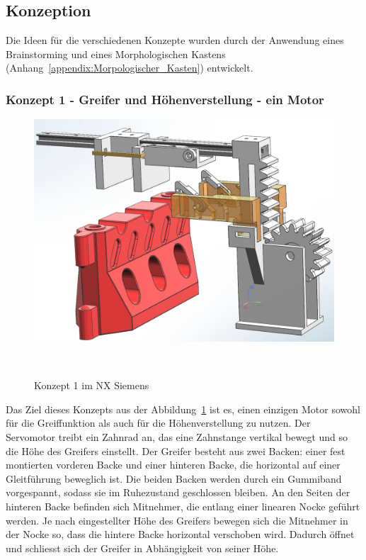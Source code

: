 \documentclass[main.tex]{subfiles} %
\begin{document}
\newpage

\subsection*{Konzeption}

Die Ideen für die verschiedenen Konzepte wurden durch der Anwendung eines Brainstorming und eines Morphologischen Kastens (Anhang~\ref{appendix:Morpologischer_Kasten}) entwickelt.

\subsubsection*{Konzept 1 - Greifer und Höhenverstellung - ein Motor}

\begin{figure}[H]
    \centering
    \includegraphics[width=1\textwidth]{Konzept_1_Ein_Motor.png}
    \caption{Konzept 1 im NX Siemens}~\label{fig:Konzept_1}
\end{figure}

Das Ziel dieses Konzepts aus der Abbildung~\ref{fig:Konzept_1} ist es, einen einzigen Motor sowohl für die Greiffunktion als auch für die Höhenverstellung zu nutzen. 
Der Servomotor treibt ein Zahnrad an, das eine Zahnstange vertikal bewegt und so die Höhe des Greifers einstellt.
Der Greifer besteht aus zwei Backen: einer fest montierten vorderen Backe und einer hinteren Backe, die horizontal auf einer 
Gleitführung beweglich ist. Die beiden Backen werden durch ein Gummiband vorgespannt, sodass sie im Ruhezustand geschlossen bleiben.
An den Seiten der hinteren Backe befinden sich Mitnehmer, die entlang einer linearen Nocke geführt werden. Je nach eingestellter 
Höhe des Greifers bewegen sich die Mitnehmer in der Nocke so, dass die hintere Backe horizontal verschoben wird. Dadurch öffnet 
und schliesst sich der Greifer in Abhängigkeit von seiner Höhe.
\end{document}
